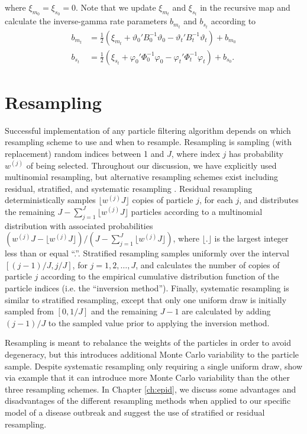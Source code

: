 where $\xi_{m_0} = \xi_{s_0} = 0$. Note that we update $\xi_{m_t}$ and $\xi_{s_t}$ in the recursive map and calculate the inverse-gamma rate parameters $b_{m_t}$ and $b_{s_t}$ according to
\begin{align}
b_{m_t} &= \frac{1}{2}\left(\xi_{m_t} + \vartheta_0'B_0^{-1}\vartheta_0 - \vartheta_t'B_t^{-1}\vartheta_t\right) + b_{m_0} \label{eqn:pl:dr:rate} \\
b_{s_t} &= \frac{1}{2}\left(\xi_{s_t} + \varphi_0'\Phi_0^{-1}\varphi_0 - \varphi_t'\Phi_t^{-1}\varphi_t\right) + b_{s_0}. \nonumber
\end{align}

\section{Resampling \label{sec:resample}}

Successful implementation of any particle filtering algorithm depends on which resampling scheme to use and when to resample. Resampling is sampling (with replacement) random indices between 1 and $J$, where index $j$ has probability $w^{(j)}$ of being selected. Throughout our discussion, we have explicitly used multinomial resampling, but alternative resampling schemes exist including residual, stratified, and systematic resampling \citep{Douc:Capp:Moul:comp:2005}. Residual resampling deterministically samples $\lfloor w^{(j)} J \rfloor$ copies of particle $j$, for each $j$, and distributes the remaining $J - \sum^J_{j=1} \lfloor w^{(j)} J \rfloor$  particles according to a multinomial distribution with associated probabilities $(w^{(j)} J - \lfloor w^{(j)} J \rfloor) / (J - \sum^J_{j=1} \lfloor w^{(j)} J \rfloor)$, where $\lfloor . \rfloor$ is the largest integer less than or equal ``.''. Stratified resampling samples uniformly over the interval $[(j-1) / J, j / J]$, for $j = 1, 2, \ldots, J$, and calculates the number of copies of particle $j$ according to the empirical cumulative distribution function of the particle indices (i.e. the ``inversion method''). Finally, systematic resampling is similar to stratified resampling, except that only one uniform draw is initially sampled from $[0, 1/J]$ and the remaining $J-1$ are calculated by adding $(j-1) / J$ to the sampled value prior to applying the inversion method.

Resampling is meant to rebalance the weights of the particles in order to avoid degeneracy, but this introduces additional Monte Carlo variability to the particle sample. Despite systematic resampling only requiring a single uniform draw, \citet{Douc:Capp:Moul:comp:2005} show via example that it can introduce more Monte Carlo variability than the other three resampling schemes. In Chapter \ref{ch:epid}, we discuss some advantages and disadvantages of the different resampling methods when applied to our specific model of a disease outbreak and suggest the use of stratified or residual resampling.

